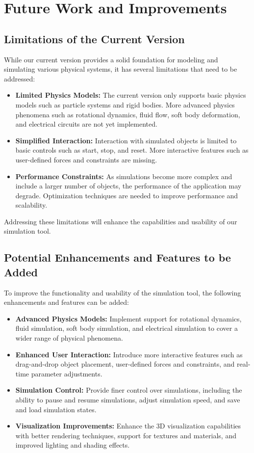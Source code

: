 \chapter{Future Work and Improvements}

\section{Limitations of the Current Version}

While our current version provides a solid foundation for modeling and simulating various physical systems, it has several limitations that need to be addressed:

\begin{itemize}
    \item \textbf{Limited Physics Models:} The current version only supports basic physics models such as particle systems and rigid bodies. More advanced physics phenomena such as rotational dynamics, fluid flow, soft body deformation, and electrical circuits are not yet implemented.
    \item \textbf{Simplified Interaction:} Interaction with simulated objects is limited to basic controls such as start, stop, and reset. More interactive features such as user-defined forces and constraints are missing.
    \item \textbf{Performance Constraints:} As simulations become more complex and include a larger number of objects, the performance of the application may degrade. Optimization techniques are needed to improve performance and scalability.
\end{itemize}

Addressing these limitations will enhance the capabilities and usability of our simulation tool.

\section{Potential Enhancements and Features to be Added}

To improve the functionality and usability of the simulation tool, the following enhancements and features can be added:

\begin{itemize}
    \item \textbf{Advanced Physics Models:} Implement support for rotational dynamics, fluid simulation, soft body simulation, and electrical simulation to cover a wider range of physical phenomena.
    \item \textbf{Enhanced User Interaction:} Introduce more interactive features such as drag-and-drop object placement, user-defined forces and constraints, and real-time parameter adjustments.
    \item \textbf{Simulation Control:} Provide finer control over simulations, including the ability to pause and resume simulations, adjust simulation speed, and save and load simulation states.
    \item \textbf{Visualization Improvements:} Enhance the 3D visualization capabilities with better rendering techniques, support for textures and materials, and improved lighting and shading effects.
\end{itemize}

